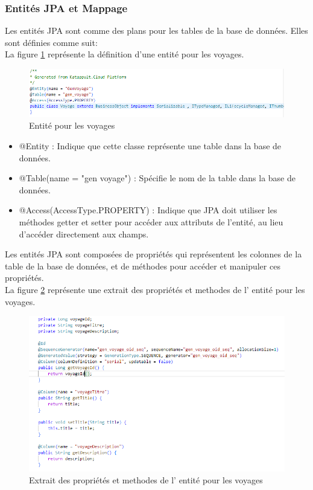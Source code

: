 \documentclass[12pt]{report}
\begin{document}
			\subsubsection{Entités JPA et Mappage}

			\hspace{15pt} Les entités JPA sont comme des plans pour les tables de la base de données. Elles sont définies comme suit:\\

			La figure \ref{fig:entityjpa} représente la définition d'une entité pour les voyages.
			
			\begin{figure}[h]
				\centering
				\includegraphics[width=\textwidth]{entityjpa.jpg}
				\caption{Entité pour les voyages}
				\label{fig:entityjpa}
			\end{figure}
			\FloatBarrier

			\begin{itemize}
				\item @Entity : Indique que cette classe représente une table dans la base de données.
				\item @Table(name = "gen voyage") : Spécifie le nom de la table dans la base de données.
				\item @Access(AccessType.PROPERTY) : Indique que JPA doit utiliser les méthodes getter et setter pour accéder aux attributs de l'entité, au lieu d'accéder directement aux champs.
			\end{itemize}
	
			Les entités JPA sont composées de propriétés qui représentent les colonnes de la table de la base de données, et de méthodes pour accéder et manipuler ces propriétés.\\

			La figure \ref{fig:propmeth} représente une extrait des propriétés et methodes de l' entité pour les voyages.
			
			\begin{figure}[h]
				\centering
				\includegraphics[width=\textwidth]{propmeth.jpg}
				\caption{Extrait des propriétés et methodes de l' entité pour les voyages}
				\label{fig:propmeth}
			\end{figure}
			\FloatBarrier
\end{document}
